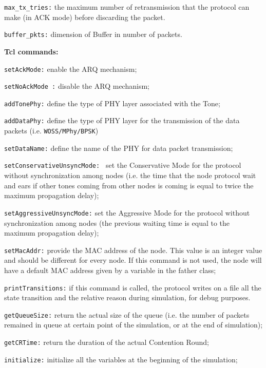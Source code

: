 \begin{description}
\begin{description}
		\item {\tt max\_tx\_tries:} the maximum number of retransmission that the protocol can make (in ACK mode) before discarding the packet.
		\item {\tt buffer\_pkts:} dimension of Buffer in number of packets.
	\end{description}
   \item {\bf Tcl commands: }
   	\begin{description}
		\item {\tt setAckMode:} enable the ARQ mechanism;
		\item {\tt setNoAckMode :} disable the ARQ mechanism;
		\item{\tt addTonePhy:} define the type of PHY layer associated with the Tone;
		\item{\tt addDataPhy:} define the type of PHY layer for the transmission of the data packets (i.e. {\tt WOSS/MPhy/BPSK})
		\item {\tt setDataName:} define the name of the PHY for data packet transmission;
		\item {\tt setConservativeUnsyncMode: } set the Conservative Mode for the protocol without synchronization among nodes (i.e. the time that the node protocol wait and ears if other tones coming from other nodes is coming is equal to twice the maximum propagation delay);
		\item {\tt setAggressiveUnsyncMode:} set the Aggressive Mode for the protocol without synchronization among nodes (the previous waiting time is equal to the maximum propagation delay);
	         \item {\tt setMacAddr:} provide the MAC address of the node. This value is an integer value and should be different for every node. If this command is not used, the node will have a default MAC address given by a variable in the father class;
	         	  \item {\tt printTransitions:} if this command is called, the protocol writes on a file all the state transition and the relative reason during simulation, for debug purposes.
		  \item {\tt getQueueSize:} return the actual size of the queue (i.e. the number of packets remained in queue at certain point of the simulation, or at the end of simulation);
		  \item {\tt getCRTime:} return the duration of the actual Contention Round;
		  \item {\tt initialize:} initialize all the variables at the beginning of the simulation;

\end{description}
\end{description}
